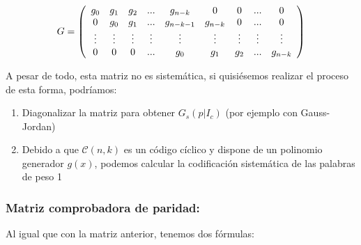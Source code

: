 \documentclass{article}
\begin{document}
\begin{equation}
    G = 
    \left(
    \begin{array}{c c c c c c c c c}
        g_0 & g_1 & g_2 & ... & g_{n-k} & 0 & 0 & ... & 0 \\
        0 & g_0 & g_1 & ... & g_{n-k-1} & g_{n-k} & 0 & ... & 0 \\
        \vdots & \vdots & \vdots & \vdots & \vdots & \vdots & \vdots & \vdots & \vdots \\
        0 & 0 & 0 & ... & g_0 & g_1 & g_2 & ... & g_{n-k} \\
    \end{array}
    \right)
\end{equation}

A pesar de todo, esta matriz no es sistemática, si quisiésemos realizar el proceso de esta forma, podríamos:

\begin{enumerate}
    \item Diagonalizar la matriz para obtener $G_s(p|I_c)$ (por ejemplo con Gauss-Jordan)
    \item Debido a que $\mathcal{C}(n,k)$ es un código cíclico y dispone de un polinomio generador $g(x)$, podemos calcular la codificación sistemática de las palabras de peso 1
\end{enumerate}

\subsubsection{Matriz comprobadora de paridad:}

Al igual que con la matriz anterior, tenemos dos fórmulas:
\end{document}
